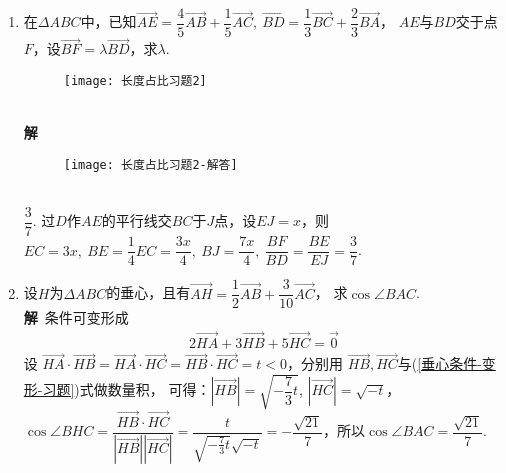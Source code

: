 \begin{enumerate}[leftmargin=\inteval{\myenumleftmargin}pt]
\item 在$ \Delta ABC $中，已知$ \vec{AE}=\dfrac{4}{5}
\vec{AB}+\dfrac{1}{5}\vec{AC},\ \vec{BD}=
\dfrac{1}{3}\vec{BC}+\dfrac{2}{3}\vec{BA} $，
$ AE $与$ BD $交于点$ F $，设$ \vec{BF}=\lambda 
\vec{BD} $，求$ \lambda $. 
\begin{figure}[h]
    \centering
    \texttt{[image: 长度占比习题2]}
\end{figure}
\ifteach \\ \textbf{解}\ 
\begin{figure}[h]
    \centering
    \texttt{[image: 长度占比习题2-解答]}
\end{figure}\\
$ \dfrac{3}{7} $. 过$ D $作$ AE $的平行线交$ BC $于$ J $点，设$ EJ=x $，则$ EC=3x,\ BE=\dfrac{1}{4}EC=\dfrac{3x}{4},\ BJ=\dfrac{7x}{4},\ \dfrac{BF}{BD}=\dfrac{BE}{EJ}=\dfrac{3}{7} $. 
\fi

\item 设$ H $为$ \Delta ABC $的垂心，且有$ \vec{AH}=
\dfrac{1}{2}\vec{AB}+\dfrac{3}{10}\vec{AC} $，
求$ \cos \angle BAC $. 
\ifteach \\ \textbf{解}\ 条件可变形成
\begin{align}\label{垂心条件-变形-习题}
    2\vec{HA}+
    3\vec{HB} +5\vec{HC}=\vec{0}
\end{align}
设 $ \vec{HA}\cdot \vec{HB}=\vec{HA}
\cdot\vec{HC}=\vec{HB}\cdot \vec{HC}=t<0 $，分别用
$ \vec{HB},\vec{HC} $与(\ref{垂心条件-变形-习题})式做数量积，
可得：$ |\vec{HB}|=\sqrt{-\dfrac{7}{3}t} $, $ |\vec{HC}|=\sqrt{-t} $，
$ \cos\angle BHC=\dfrac{\vec{HB}\cdot \vec{HC}}
{|\vec{HB}||\vec{HC}|}=\dfrac{t}{\sqrt{-\frac{7}{3}t}\sqrt{-t}}
=-\dfrac{\sqrt{21}}{7} $，所以$ \cos \angle BAC=\dfrac{\sqrt{21}}{7} $.
\fi


\end{enumerate}
